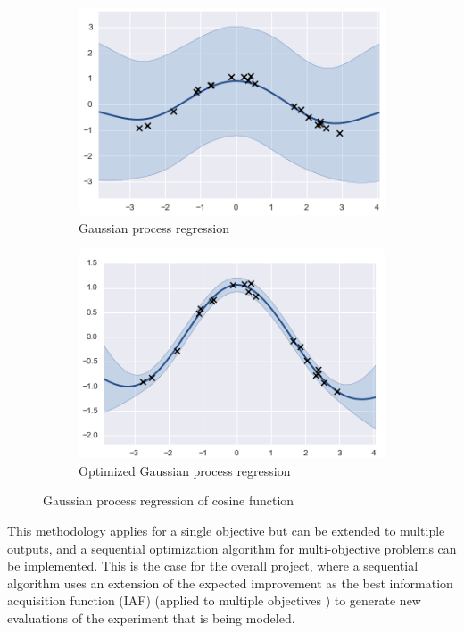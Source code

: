 \documentclass{article}
\begin{document}
\begin{figure}
\centering
	\begin{subfigure}[b]{0.4\textwidth}
        \includegraphics[width=\textwidth]{gp_cosine.png}
        \caption{Gaussian process regression}
        \label{gp}
	\end{subfigure}
    \hfill
	\begin{subfigure}[b]{0.4\textwidth}
        \includegraphics[width=\textwidth]{gp_cosine_optimized.png}
	    \caption{Optimized Gaussian process regression}
	    \label{gp_optimized}
	\end{subfigure}
\caption{Gaussian process regression of cosine function}
\label{gp_regression}
\end{figure}

This methodology applies for a single objective but can be extended to multiple outputs, and a sequential optimization algorithm for multi-objective problems can be implemented. This is the case for the overall project, where a sequential algorithm uses an extension of the expected improvement as the best information acquisition function (IAF)\cite{Jones2001} (applied to multiple objectives \cite{wagner2010expected}) to generate new evaluations of the experiment that is being modeled.
\end{document}
